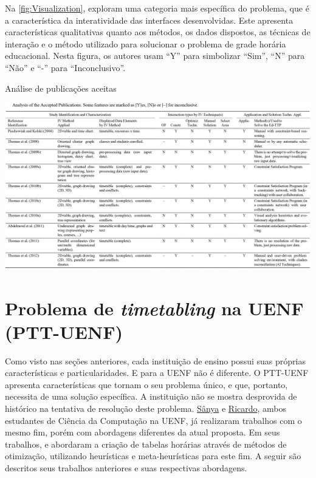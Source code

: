 Na \autoref{fig:Visualization},  exploram uma categoria mais específica do problema, que é a característica da interatividade das interfaces desenvolvidas. Este apresenta características qualitativas quanto aos métodos, os dados dispostos, as técnicas de interação e o método utilizado para solucionar o problema de grade horária educacional. Nesta figura, os autores usam ``Y'' para simbolizar ``Sim'', ``N'' para ``Não'' e ``-'' para ``Inconclusivo''.

\begin{CenteredFigure} \caption{Análise de publicações aceitas} \label{fig:Visualization}
  \includegraphics[width=\textwidth]{files/img/2.02!2-marco/Visualization}
\end{CenteredFigure}    %

\section{Problema de \textit{timetabling} na UENF (PTT-UENF)} \label{sec:anteriores}                               %

Como visto nas seções anteriores, cada instituição de ensino possui suas próprias características e particularidades. E para a UENF não é diferente. O PTT-UENF apresenta características que tornam o seu problema único, e que, portanto, necessita de uma solução específica. A instituição não se mostra desprovida de histórico na tentativa de resolução deste problema. \hyperref[ssec:sanya]{Sânya} e \hyperref[ssec:ricardo]{Ricardo}, ambos estudantes de Ciência da Computação na UENF, já realizaram trabalhos com o mesmo fim, porém com abordagens diferentes da atual proposta. Em seus trabalhos,  e  abordaram a criação de tabelas horárias através de métodos de otimização, utilizando heurísticas e meta-heurísticas para este fim. A seguir são descritos seus trabalhos anteriores e suas respectivas abordagens.

